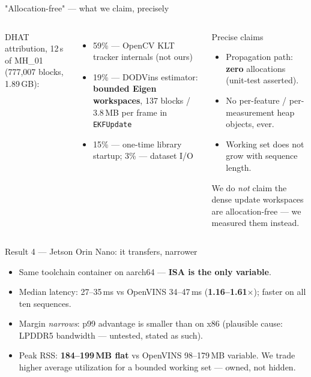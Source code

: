 \documentclass[aspectratio=169,11pt]{beamer}
\begin{document}
\begin{frame}{"Allocation-free" --- what we claim, precisely}
  \begin{columns}
    DHAT attribution, 12\,s of MH\_01 (777{,}007 blocks, 1.89\,GB):
    \begin{itemize}
      \item 59\% --- OpenCV KLT tracker internals (not ours)
      \item 19\% --- DODVins estimator: \textbf{bounded Eigen workspaces},
            137 blocks / 3.8\,MB per frame in \texttt{EKFUpdate}
      \item 15\% --- one-time library startup; 3\% --- dataset I/O
    \end{itemize}
    \begin{block}{Precise claims}
      \begin{itemize}
        \item Propagation path: \textbf{zero} allocations (unit-test
              asserted).
        \item No per-feature / per-measurement heap objects, ever.
        \item Working set does not grow with sequence length.
      \end{itemize}
      We do \emph{not} claim the dense update workspaces are
      allocation-free --- we measured them instead.
    \end{block}
  \end{columns}
\end{frame}

\begin{frame}{Result 4 --- Jetson Orin Nano: it transfers, narrower}
  \begin{itemize}
    \item Same toolchain container on aarch64 --- \textbf{ISA is the only
          variable}.
    \item Median latency: 27--35\,ms vs OpenVINS 34--47\,ms
          (\textbf{1.16--1.61$\times$}); faster on all ten sequences.
    \item Margin \emph{narrows}: p99 advantage is smaller than on x86
          (plausible cause: LPDDR5 bandwidth --- untested, stated as such).
    \item Peak RSS: \textbf{184--199\,MB flat} vs OpenVINS 98--179\,MB
          variable. We trade higher average utilization for a bounded
          working set --- owned, not hidden.
  \end{itemize}
\end{frame}
\end{document}
